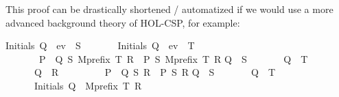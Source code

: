 \begin{isabellebody}
%
\endisadelimproof
%
\begin{isamarkuptext}%
This proof can be drastically shortened / automatized if we would use a more advanced 
background theory of HOL-CSP, for example:%
\end{isamarkuptext}\isamarkuptrue%
\isamarkupfalse%
{\isacartoucheopen}Initials\ Q\ {\isasymsubseteq}\ ev\ {\isacharbackquote}{\kern0pt}\ S\ \isanewline
\ \ \ \ \ {\isasymLongrightarrow}\ Initials\ Q\ {\isasyminter}\ ev\ {\isacharbackquote}{\kern0pt}\ T\ {\isacharequal}{\kern0pt}\ {\isacharbraceleft}{\kern0pt}{\isacharbraceright}{\kern0pt}\ \isanewline
\ \ \ \ \ {\isasymLongrightarrow}\ \ {\isacharparenleft}{\kern0pt}{\isacharparenleft}{\kern0pt}P\ {\isasymbox}\ Q{\isacharparenright}{\kern0pt}\ {\isasymlbrakk}S{\isasymrbrakk}\ {\isacharparenleft}{\kern0pt}Mprefix\ T\ R{\isacharparenright}{\kern0pt}{\isacharparenright}{\kern0pt}\ {\isacharequal}{\kern0pt}\ P\ {\isasymlbrakk}S{\isasymrbrakk}\ {\isacharparenleft}{\kern0pt}Mprefix\ T\ R{\isacharparenright}{\kern0pt}{\isacartoucheclose}\isanewline
\isanewline
{}\isamarkupfalse%
{\isacartoucheopen}{\isasymalpha}{\isacharparenleft}{\kern0pt}Q{\isacharparenright}{\kern0pt}\ {\isasymsubseteq}\ S\ \isanewline
\ \ \ \ \ {\isasymLongrightarrow}\ {\isasymalpha}{\isacharparenleft}{\kern0pt}Q{\isacharparenright}{\kern0pt}\ {\isasyminter}\ T\ {\isacharequal}{\kern0pt}\ {\isacharbraceleft}{\kern0pt}{\isacharbraceright}{\kern0pt}\ \isanewline
\ \ \ \ \ {\isasymLongrightarrow}\ {\isasymalpha}{\isacharparenleft}{\kern0pt}Q{\isacharparenright}{\kern0pt}\ {\isasyminter}\ {\isasymalpha}{\isacharparenleft}{\kern0pt}R{\isacharparenright}{\kern0pt}\ {\isacharequal}{\kern0pt}\ {\isacharbraceleft}{\kern0pt}{\isacharbraceright}{\kern0pt}\ \isanewline
\ \ \ \ \ {\isasymLongrightarrow}\ {\isacharparenleft}{\kern0pt}{\isacharparenleft}{\kern0pt}P\ {\isacharbar}{\kern0pt}{\isacharbar}{\kern0pt}{\isacharbar}{\kern0pt}\ Q{\isacharparenright}{\kern0pt}\ {\isasymlbrakk}S{\isasymrbrakk}\ R{\isacharparenright}{\kern0pt}\ {\isacharequal}{\kern0pt}\ P\ {\isasymlbrakk}S{\isasymrbrakk}\ R{\isacartoucheclose}\isanewline
\isanewline
{}\isamarkupfalse%
{\isacartoucheopen}{\isasymalpha}{\isacharparenleft}{\kern0pt}Q{\isacharparenright}{\kern0pt}\ {\isasymsubseteq}\ S\ \isanewline
\ \ \ \ \ {\isasymLongrightarrow}\ {\isasymalpha}{\isacharparenleft}{\kern0pt}Q{\isacharparenright}{\kern0pt}\ {\isasyminter}\ T\ {\isacharequal}{\kern0pt}\ {\isacharbraceleft}{\kern0pt}{\isacharbraceright}{\kern0pt}\ \isanewline
\ \ \ \ \ {\isasymLongrightarrow}\ Initials\ Q\ {\isasyminter}\ {\isasymalpha}{\isacharparenleft}{\kern0pt}{\isacharparenleft}{\kern0pt}Mprefix\ T\ R{\isacharparenright}{\kern0pt}{\isacharparenright}{\kern0pt}\ {\isacharequal}{\kern0pt}\ {\isacharbraceleft}{\kern0pt}{\isacharbraceright}{\kern0pt}\ \isanewline

\end{isabellebody}
